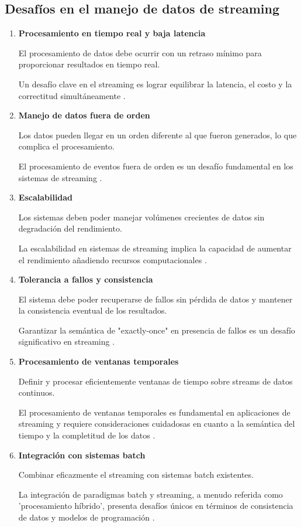 \newpage

\subsection{Desafíos en el manejo de datos de streaming}

\begin{enumerate}
    \item \textbf{Procesamiento en tiempo real y baja latencia}
    
    El procesamiento de datos debe ocurrir con un retraso mínimo para proporcionar resultados en tiempo real.
    
    Un desafío clave en el streaming es lograr equilibrar la latencia, el costo y la correctitud simultáneamente \parencite{akidau2015dataflow}.

    \item \textbf{Manejo de datos fuera de orden}
    
    Los datos pueden llegar en un orden diferente al que fueron generados, lo que complica el procesamiento.
    
    El procesamiento de eventos fuera de orden es un desafío fundamental en los sistemas de streaming \parencite[p.~87]{flink}.

    \item \textbf{Escalabilidad}
    
    Los sistemas deben poder manejar volúmenes crecientes de datos sin degradación del rendimiento.
    
    La escalabilidad en sistemas de streaming implica la capacidad de aumentar el rendimiento añadiendo recursos computacionales \parencite{samurai}.

    \newpage
    \item \textbf{Tolerancia a fallos y consistencia}
    
    El sistema debe poder recuperarse de fallos sin pérdida de datos y mantener la consistencia eventual de los resultados.
    
    Garantizar la semántica de "exactly-once" en presencia de fallos es un desafío significativo en streaming \parencite{carbone2015apache}.

    \item \textbf{Procesamiento de ventanas temporales}
    
    Definir y procesar eficientemente ventanas de tiempo sobre streams de datos continuos.
    
    El procesamiento de ventanas temporales es fundamental en aplicaciones de streaming y requiere consideraciones cuidadosas en cuanto a la semántica del tiempo y la completitud de los datos \parencite{akidau2015dataflow}.

    \item \textbf{Integración con sistemas batch}
    
    Combinar eficazmente el streaming con sistemas batch existentes.
    
    La integración de paradigmas batch y streaming, a menudo referida como 'procesamiento híbrido', presenta desafíos únicos en términos de consistencia de datos y modelos de programación \parencite{carbone2015apache}.
\end{enumerate}
\newpage
